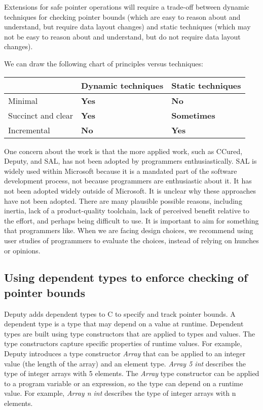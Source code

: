 \documentclass[]{article}
\begin{document}
Extensions for safe pointer operations will require a trade-off between
dynamic techniques for checking pointer bounds (which are easy to reason
about and understand, but require data layout changes) and static
techniques (which may not be easy to reason about and understand, but do
not require data layout changes).

We can draw the following chart of principles versus techniques:

\begin{longtable}[c]{@{}lll@{}}
\toprule
& Dynamic techniques & Static techniques\tabularnewline
\midrule
\endhead
Minimal & \textbf{Yes} & \textbf{No}\tabularnewline
Succinct and clear & \textbf{Yes} & \textbf{Sometimes}\tabularnewline
Incremental & \textbf{No} & \textbf{Yes}\tabularnewline
\bottomrule
\end{longtable}

One concern about the work is that the more applied work, such as
CCured, Deputy, and SAL, has not been adopted by programmers
enthusiastically. SAL is widely used within Microsoft because it is a
mandated part of the software development process, not because
programmers are enthusiastic about it. It has not been adopted widely
outside of Microsoft. It is unclear why these approaches have not been
adopted. There are many plausible possible reasons, including inertia,
lack of a product-quality toolchain, lack of perceived benefit relative
to the effort, and perhaps being difficult to use. It is important to
aim for something that programmers like. When we are facing design
choices, we recommend using user studies of programmers to evaluate the
choices, instead of relying on hunches or opinions.

\subsection{\texorpdfstring{\protect\hypertarget{ux5fToc420589167}{}{\protect\hypertarget{ux5fToc422906948}{}{\protect\hypertarget{ux5fToc424307671}{}{\protect\hypertarget{ux5fToc426641127}{}{\protect\hypertarget{ux5fToc435435002}{}{\protect\hypertarget{ux5fToc437460835}{}{\protect\hypertarget{ux5fToc440445516}{}{\protect\hypertarget{ux5fToc440449298}{}{\protect\hypertarget{ux5fToc440551948}{}{}}}}}}}}}Using
dependent types to enforce checking of pointer
bounds}{Using dependent types to enforce checking of pointer bounds}}\label{using-dependent-types-to-enforce-checking-of-pointer-bounds}

Deputy adds dependent types to C to specify and track pointer bounds. A
dependent type is a type that may depend on a value at runtime.
Dependent types are built using type constructors that are applied to
types and values. The type constructors capture specific properties of
runtime values. For example, Deputy introduces a type constructor
\emph{Array} that can be applied to an integer value (the length of the
array) and an element type. \emph{Array 5 int} describes the type of
integer arrays with 5 elements. The \emph{Array} type constructor can be
applied to a program variable or an expression, so the type can depend
on a runtime value. For example, \emph{Array n int} describes the type
of integer arrays with n elements.
\end{document}
